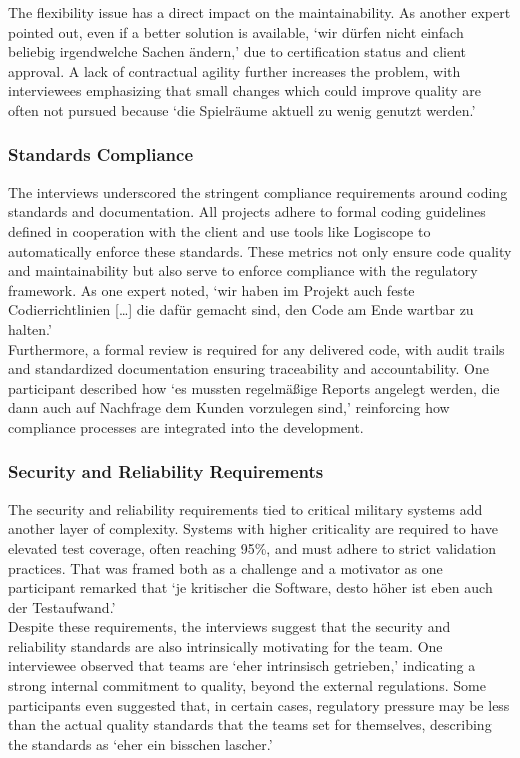The flexibility issue has a direct impact on the maintainability. As another expert pointed out, even if a better solution is available, `wir dürfen nicht einfach beliebig irgendwelche Sachen ändern,' due to certification status and client approval. A lack of contractual agility further increases the problem,
with interviewees emphasizing that small changes which could improve quality are often not pursued because `die Spielräume aktuell zu wenig genutzt werden.'

\subsubsection{Standards Compliance}
The interviews underscored the stringent compliance requirements around coding standards and documentation. All projects adhere to formal coding guidelines defined in cooperation with the client and use tools like Logiscope to automatically enforce these standards.
These metrics not only ensure code quality and maintainability but also serve to enforce compliance with the regulatory framework. As one expert noted, `wir haben im Projekt auch feste Codierrichtlinien [\ldots] die dafür gemacht sind, den Code am Ende wartbar zu halten.'\\
Furthermore, a formal review is required for any delivered code, with audit trails and standardized documentation ensuring traceability and accountability. One participant described how `es mussten regelmäßige Reports angelegt werden, die dann auch auf Nachfrage dem Kunden vorzulegen sind,' reinforcing how compliance processes are integrated into the development.

\subsubsection{Security and Reliability Requirements}
The security and reliability requirements tied to critical military systems add another layer of complexity. Systems with higher criticality are required to have elevated test coverage, often reaching 95\%, and must adhere to strict validation practices. That was framed both as a challenge and a motivator
as one participant remarked that `je kritischer die Software, desto höher ist eben auch der Testaufwand.'\\
Despite these requirements, the interviews suggest that the security and reliability standards are also intrinsically motivating for the team. One interviewee observed that teams are `eher intrinsisch getrieben,' indicating a strong internal commitment to quality, beyond the external regulations. 
Some participants even suggested that, in certain cases, regulatory pressure may be less than the actual quality standards that the teams set for themselves, describing the standards as `eher ein bisschen lascher.'

